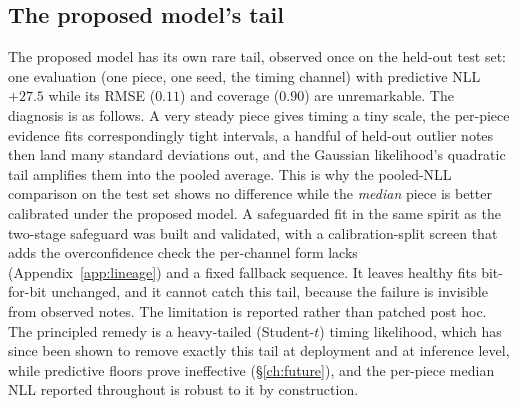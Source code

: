 \subsection{The proposed model's tail}
\label{sec:guard-gp}
The proposed model has its own rare tail, observed once on the held-out test
set: one evaluation (one piece, one seed, the timing channel) with predictive
NLL $+27.5$ while its RMSE ($0.11$) and coverage ($0.90$) are unremarkable.
The diagnosis is as follows. A very steady piece gives timing a tiny scale,
the per-piece evidence fits correspondingly tight intervals, a handful of
held-out outlier notes then land many standard deviations out, and the
Gaussian likelihood's quadratic tail amplifies them into the pooled average.
This is why the pooled-NLL comparison on the test set shows no difference
while the \emph{median} piece is better calibrated under the proposed model.
A safeguarded fit in the same spirit as the two-stage safeguard was built and
validated, with a calibration-split screen that adds the overconfidence check
the per-channel form lacks (Appendix~\ref{app:lineage}) and a fixed fallback
sequence. It leaves healthy fits bit-for-bit unchanged, and it cannot catch
this tail, because the failure is invisible from observed notes. The
limitation is reported rather than patched post hoc. The principled remedy is
a heavy-tailed (Student-$t$) timing likelihood, which has since been shown to
remove exactly this tail at deployment and at inference level, while
predictive floors prove ineffective (\S\ref{ch:future}), and the per-piece
median NLL reported throughout is robust to it by construction.


